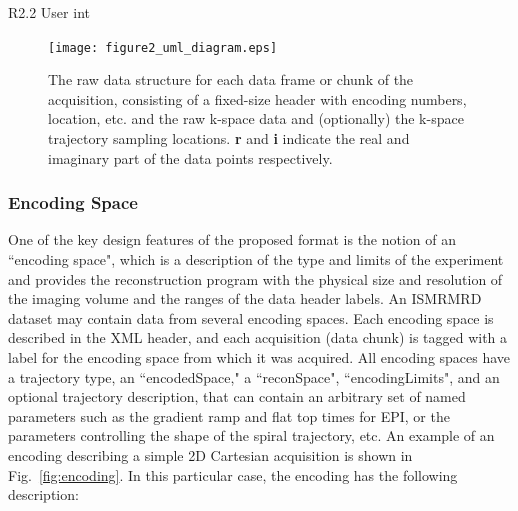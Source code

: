 \documentclass[12pt, draft]{article}
\begin{document}
R2.2 User int


\begin{figure}
\begin{center}
\texttt{[image: figure2\_uml\_diagram.eps]}
\caption{The raw data structure for each data frame or chunk of the acquisition, consisting of a fixed-size header with encoding numbers, location, etc. and the raw k-space data and (optionally) the k-space trajectory sampling locations. \textbf{r} and \textbf{i} indicate the real and imaginary part of the data points respectively.}
\label{fig:cstruct}
\end{center}
\end{figure}

\subsubsection*{Encoding Space}
One of the key design features of the proposed format is the notion of an ``encoding space", which is a description of the type and limits of the experiment and provides the reconstruction program with the physical size and resolution of the imaging volume and the ranges of the data header labels.  An ISMRMRD dataset may contain data from several encoding spaces.  Each encoding space is described in the XML header, and each acquisition (data chunk) is tagged with a label for the encoding space from which it was acquired. All encoding spaces have a trajectory type, an ``encodedSpace," a ``reconSpace", ``encodingLimits", and an optional trajectory description, that can contain an arbitrary set of named parameters such as the gradient ramp and flat top times for EPI, or the parameters controlling the shape of the spiral trajectory, etc.  An example of an encoding describing a simple 2D Cartesian acquisition is shown in Fig.~\ref{fig:encoding}.  In this particular case, the encoding has the following description:
\end{document}
